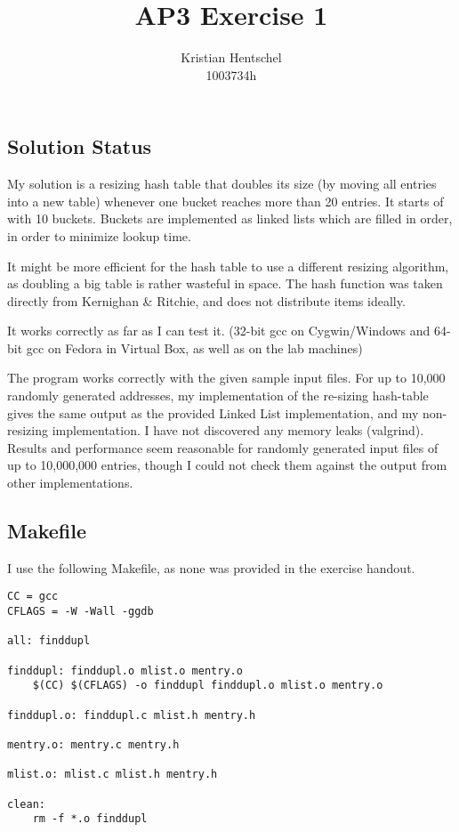\documentclass{article}
\title{AP3 Exercise 1}
\author{Kristian Hentschel\\1003734h}
\begin{document}
\maketitle

\subsection{Solution Status}
My solution is a resizing hash table that doubles its size (by moving all entries into a new table) whenever one bucket reaches more than 20 entries. It starts of with 10 buckets. Buckets are implemented as linked lists which are filled in order, in order to minimize lookup time.

It might be more efficient for the hash table to use a different resizing algorithm, as doubling a big table is rather wasteful in space. The hash function was taken directly from Kernighan & Ritchie, and does not distribute items ideally.

It works correctly as far as I can test it. (32-bit gcc on Cygwin/Windows and 64-bit gcc on Fedora in Virtual Box, as well as on the lab machines)

The program works correctly with the given sample input files. For up to 10,000 randomly generated addresses, my implementation of the re-sizing hash-table gives the same output as the provided Linked List implementation, and my non-resizing implementation. I have not discovered any memory leaks (valgrind). Results and performance seem reasonable for randomly generated input files of up to 10,000,000 entries, though I could not check them against the output from other implementations.

\subsection{Makefile}
I use the following Makefile, as none was provided in the exercise handout.

\begin{lstlisting}
CC = gcc
CFLAGS = -W -Wall -ggdb

all: finddupl

finddupl: finddupl.o mlist.o mentry.o
	$(CC) $(CFLAGS) -o finddupl finddupl.o mlist.o mentry.o

finddupl.o: finddupl.c mlist.h mentry.h

mentry.o: mentry.c mentry.h

mlist.o: mlist.c mlist.h mentry.h

clean:
	rm -f *.o finddupl
\end{lstlisting}
\end{document}
